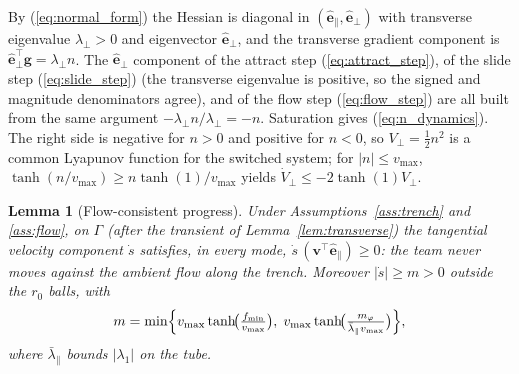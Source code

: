 \documentclass[lettersize,journal]{IEEEtran}
\newtheorem{lemma}{Lemma}
\begin{document}
\begin{IEEEproof}
By (\ref{eq:normal_form}) the Hessian is diagonal in
$(\hat{\mathbf{e}}_\parallel, \hat{\mathbf{e}}_\perp)$ with transverse
eigenvalue $\lambda_\perp > 0$ and eigenvector
$\hat{\mathbf{e}}_\perp$, and the transverse gradient component is
$\hat{\mathbf{e}}_\perp^\top \mathbf{g} = \lambda_\perp n$. The
$\hat{\mathbf{e}}_\perp$ component of the attract step
(\ref{eq:attract_step}), of the slide step (\ref{eq:slide_step}) (the
transverse eigenvalue is positive, so the signed and magnitude
denominators agree), and of the flow step (\ref{eq:flow_step}) are all
built from the same argument $-\lambda_\perp n / \lambda_\perp = -n$.
Saturation gives (\ref{eq:n_dynamics}). The right side is negative for $n > 0$ and
positive for $n < 0$, so $V_\perp = \tfrac{1}{2}n^2$ is a common
Lyapunov function for the switched system; for $|n| \leq v_{\max}$,
$\tanh(n/v_{\max}) \geq n \tanh(1)/v_{\max}$ yields $\dot{V}_\perp \leq
-2\tanh(1) V_\perp$.
\end{IEEEproof}

\begin{lemma}[Flow-consistent progress]
\label{lem:progress}
Under Assumptions~\ref{ass:trench} and \ref{ass:flow}, on $\Gamma$
(after the transient of Lemma~\ref{lem:transverse}) the tangential
velocity component $\dot{s}$ satisfies, in every mode,
$\dot{s}\,(\mathbf{v}^\top \hat{\mathbf{e}}_\parallel) \geq 0$: the team
never moves against the ambient flow along the trench. Moreover
$|\dot{s}| \geq m > 0$ outside the $r_0$ balls, with
\begin{equation}
    m = \min\Bigl\{
    v_{\max}\tanh\!\bigl(\tfrac{f_{\min}}{v_{\max}}\bigr),\;
    v_{\max}\tanh\!\bigl(\tfrac{m_\varphi}
    {\bar{\lambda}_\parallel v_{\max}}\bigr)
    \Bigr\},
    \label{eq:progress_rate}
\end{equation}
where $\bar{\lambda}_\parallel$ bounds $|\lambda_1|$ on the tube.
\end{lemma}
\end{document}
